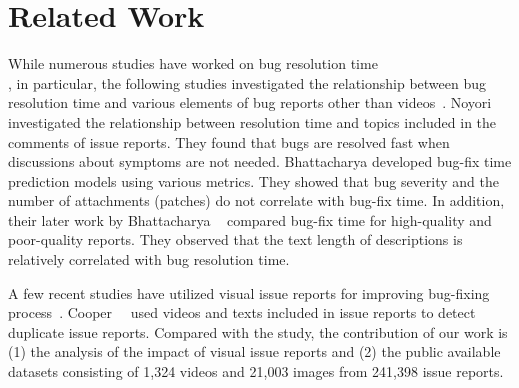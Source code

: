 \section{Related Work}
\label{sec:relate}
While numerous studies have worked on bug resolution time~\citep{DBLP:conf/msr/ChenNSH14}\citep{DBLP:journals/jss/GarciaSN18}\citep{DBLP:conf/sigsoft/JeongKZ09}\\
\citep{DBLP:conf/icsm/KashiwaYKO14}\citep{DBLP:conf/msr/ZamanAH11}, 
in particular, the following studies investigated the relationship between bug resolution time and various elements of bug reports other than videos~\citep{DBLP:conf/msr/BhattacharyaN11}\citep{DBLP:conf/csmr/BhattacharyaUNK13}\citep{DBLP:journals/ieicetd/NoyoriWFKONT21}. 
Noyori~\et~\citep{DBLP:journals/ieicetd/NoyoriWFKONT21} investigated the relationship between resolution time and topics included in the comments of issue reports. 
They found that bugs are resolved fast when discussions about symptoms are not needed.  Bhattacharya \et \citep{DBLP:conf/msr/BhattacharyaN11} developed bug-fix
time prediction models using various metrics. They showed that bug severity and the number of attachments (patches) do not correlate with bug-fix time. In addition, their later work by Bhattacharya \et~\citep{DBLP:conf/csmr/BhattacharyaUNK13} compared bug-fix time for high-quality and poor-quality reports. They observed that the text length of descriptions is relatively correlated with bug resolution time. 

A few recent studies have utilized visual issue reports for improving bug-fixing process~\citep{DBLP:conf/icse/CooperBCMP21}. Cooper~\et~\citep{DBLP:conf/icse/CooperBCMP21} used videos and texts included in issue reports to detect duplicate issue reports. Compared with the study, the contribution of our work is (1) the analysis of the impact of visual issue reports and (2) the public available datasets consisting of 1,324 videos and 21,003 images from 241,398 issue reports.